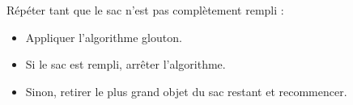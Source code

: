 
Répéter tant que le sac n'est pas complètement rempli :
\begin{itemize}
  \item Appliquer l'algorithme glouton.
  \item Si le sac est rempli, arrêter l'algorithme.
  \item Sinon, retirer le plus grand objet du sac restant et recommencer.
\end{itemize}
